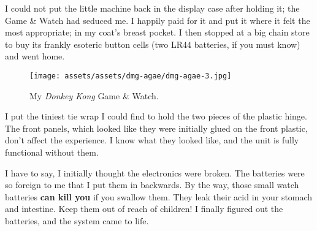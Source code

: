 \documentclass{book}
\begin{document}
I could not put the little machine back in the display case after holding it; the Game \& Watch had seduced me. I happily paid for it and put it where it felt the most appropriate; in my coat’s breast pocket. I then stopped at a big chain store to buy its frankly esoteric button cells (two LR44 batteries, if you must know) and went home.

\begin{figure}[hbt]
\vskip 10pt
\centering \texttt{[image: assets/assets/dmg-agae/dmg-agae-3.jpg]}\par\pagetwodescription My \emph{Donkey Kong} Game \& Watch.
\vskip 6pt
\end{figure}

I put the tiniest tie wrap I could find to hold the two pieces of the plastic hinge. The front panels, which looked like they were initially glued on the front plastic, don’t affect the experience. I know what they looked like, and the unit is fully functional without them.

I have to say, I initially thought the electronics were broken. The batteries were so foreign to me that I put them in backwards. By the way, those small watch batteries \textbf{can kill you} if you swallow them. They leak their acid in your stomach and intestine. Keep them out of reach of children! I finally figured out the batteries, and the system came to life.
\end{document}
